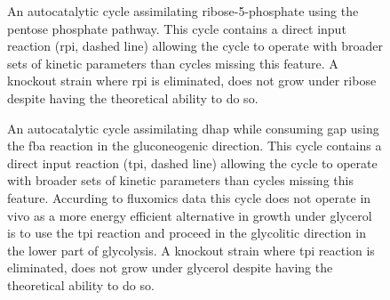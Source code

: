 \begin{figure}[h!]
    \iftoggle{elifesubmission} { }
    {
    \centering{
        }
    }
\caption{
    \label{fig:extrasamps1}
    An autocatalytic cycle assimilating ribose-5-phosphate using the pentose phosphate pathway.
    This cycle contains a direct input reaction (rpi, dashed line) allowing the cycle to operate with broader sets of kinetic parameters than cycles missing this feature.
    A knockout strain where rpi is eliminated, does not grow under ribose despite having the theoretical ability to do so.
}
\end{figure}
\begin{figure}[h!]
    \iftoggle{elifesubmission} { }
    {
    \centering{
        }
    }
\caption{
    \label{fig:extrasamps2}
    An autocatalytic cycle assimilating dhap while consuming gap using the fba reaction in the gluconeogenic direction.
    This cycle contains a direct input reaction (tpi, dashed line) allowing the cycle to operate with broader sets of kinetic parameters than cycles missing this feature.
    Accurding to fluxomics data this cycle does not operate in vivo as a more energy efficient alternative in growth under glycerol is to use the tpi reaction and proceed in the glycolitic direction in the lower part of glycolysis.
    A knockout strain where tpi reaction is eliminated, does not grow under glycerol despite having the theoretical ability to do so.
}
\end{figure}
